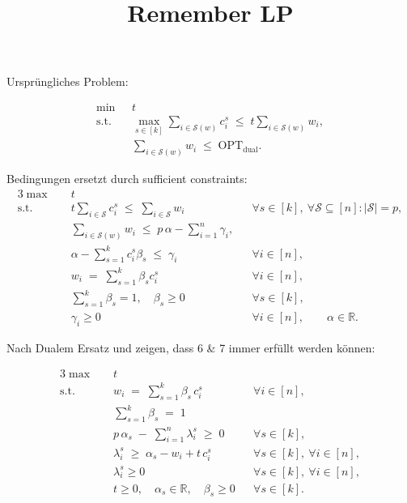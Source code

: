 \documentclass[abstracton]{scrartcl}
\title{Remember LP}
\date{}
\begin{document}
	
\maketitle
	
Ursprüngliches Problem:

\begin{align}
	\min\; & t \label{eq:mirror-obj}\\[1mm]
	\text{s.t.}\quad
	& \max_{s\in[k]} \sum_{i\in\mathcal{S}(w)} c_i^s
	\;\le\;
	t \sum_{i\in\mathcal{S}(w)} w_i,
	\label{eq:mirror-i}
	\\[1mm]
	& \sum_{i\in\mathcal{S}(w)} w_i
	\;\le\;
	\mathrm{OPT}_{\mathrm{dual}} .
	\label{eq:mirror-ii}
\end{align}
	
Bedingungen ersetzt durch sufficient constraints:
\begin{alignat}{3}
	\max \quad & t \\[1mm]
	\text{s.t.}\quad
	& t \sum_{i\in\mathcal S} c_i^s \;\le\; \sum_{i\in\mathcal S} w_i
	&& \forall s\in[k],\ \forall \mathcal S\subseteq[n]:|\mathcal S|=p, \label{eq:pd-lp-i}\\[1mm]
	& \sum_{i\in\mathcal{S}(w)} w_i \;\le\; p\,\alpha - \sum_{i=1}^n \gamma_i, \label{eq:pd-lp-ii}\\[1mm]
	& \alpha - \sum_{s=1}^k c_i^s \beta_s \;\le\; \gamma_i
	&& \forall i\in[n], \label{eq:pd-lp-dualfeas}\\[1mm]
	& w_i \;=\; \sum_{s=1}^k \beta_s c_i^s
	&& \forall i\in[n], \label{eq:pd-lp-w}\\[1mm]
	& \sum_{s=1}^k \beta_s = 1,\quad \beta_s \ge 0
	&& \forall s\in[k], \label{eq:pd-lp-simplex}\\[2mm]
	& \gamma_i \ge 0 && \forall i\in[n], \qquad \alpha\in\mathbb{R}. \label{eq:pd-lp-sign}
\end{alignat}

Nach Dualem Ersatz und zeigen, dass 6 \& 7 immer erfüllt werden können:

\begin{alignat}{3}
	\label{lp:compact}
	\max \quad & t \\[1mm]
	\text{s.t.}\quad
	& w_i \;=\; \sum_{s=1}^k \beta_s\, c_i^s
	&& \forall i\in[n], \label{lp:compact-w}\\[1mm]
	& \sum_{s=1}^k \beta_s \;=\; 1 \label{lp:compact-simplex}\\[2mm]
	& p\,\alpha_s \;-\; \sum_{i=1}^n \lambda^s_i \;\ge\; 0
	&& \forall s\in[k], \label{lp:compact-dual1}\\[1mm]
	& \lambda^s_i \;\ge\; \alpha_s - w_i + t\,c_i^s
	&& \forall s\in[k],\ \forall i\in[n], \label{lp:compact-dual2}\\[1mm]
	& \lambda^s_i \ge 0
	&& \forall s\in[k],\ \forall i\in[n], \label{lp:compact-dual3}\\[1mm]
	& t \ge 0,\quad \alpha_s \in \mathbb{R},\quad \beta_s \ge 0
	&& \forall s\in[k]. \label{lp:compact-sign}
\end{alignat}
\end{document}
